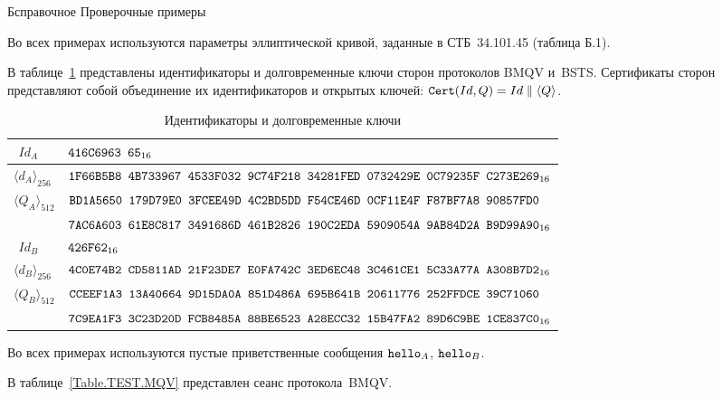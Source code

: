 \begin{appendix}{Б}{справочное}
{Проверочные примеры}
\label{TEST}

\label{TEST.Params}

Во всех примерах используются параметры эллиптической кривой, 
заданные в СТБ~34.101.45 (таблица Б.1). 

\label{TEST.Keys}

В таблице~\ref{Table.TEST.IdKeys} представлены идентификаторы
и долговременные ключи сторон протоколов BMQV и~BSTS. 
Сертификаты сторон представляют
собой объединение их идентификаторов и открытых ключей: 
$\texttt{Cert}(Id,Q)=Id\parallel\langle Q\rangle$.

\begin{table}[H]
\caption{Идентификаторы и долговременные ключи}\label{Table.TEST.IdKeys}
{\small
\begin{tabular}{|l|l|}
\hline
$\phantom{\langle}Id_A$ & 
$\texttt{416C6963~65}_{16}$\\
%
\hline
\hline
$\langle d_A\rangle_{256}$ & 
$\texttt{1F66B5B8~4B733967~4533F032~9C74F218~34281FED~0732429E~0C79235F~C273E269}_{16}$\\
%
\hline
$\langle Q_A\rangle_{512}$ & 
$\texttt{BD1A5650~179D79E0~3FCEE49D~4C2BD5DD~F54CE46D~0CF11E4F~F87BF7A8~90857FD0}$\\
&
$\texttt{7AC6A603~61E8C817~3491686D~461B2826~190C2EDA~5909054A~9AB84D2A~B9D99A90}_{16}$\\
%
\hline
\hline
$\phantom{\langle}Id_B$ & 
$\texttt{426F62}_{16}$\\
%
\hline
\hline
$\langle d_B\rangle_{256}$ & 
$\texttt{4C0E74B2~CD5811AD~21F23DE7~E0FA742C~3ED6EC48~3C461CE1~5C33A77A~A308B7D2}_{16}$\\
%
\hline
$\langle Q_B\rangle_{512}$ & 
$\texttt{CCEEF1A3~13A40664~9D15DA0A~851D486A~695B641B~20611776~252FFDCE~39C71060}$ \\
&
$\texttt{7C9EA1F3~3C23D20D~FCB8485A~88BE6523~A28ECC32~15B47FA2~89D6C9BE~1CE837C0}_{16}$\\
\hline
\end{tabular}
}
\end{table}

\label{TEST.Hello}

Во всех примерах используются пустые приветственные сообщения
$\texttt{hello}_A$, $\texttt{hello}_B$.

\label{TEST.MQV}

В таблице~\ref{Table.TEST.MQV} представлен сеанс протокола~BMQV.


\end{appendix}
